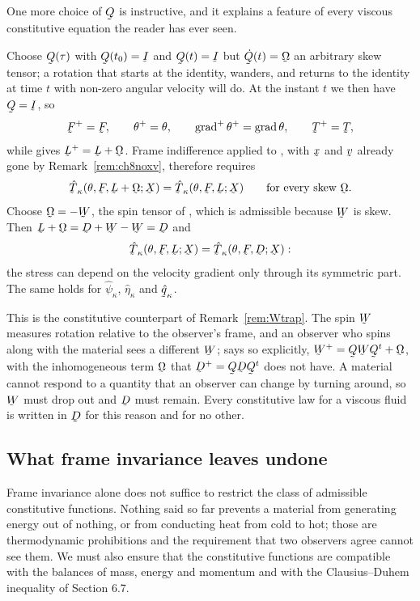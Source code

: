 \begin{remark}
\label{rem:ch8Donly}
One more choice of $\bQ$ is instructive, and it explains a feature of
every viscous constitutive equation the reader has ever seen.

Choose $\bQ(\tau)$ with $\bQ(t_{0})=\I$ and $\bQ(t)=\I$ but
$\dot\bQ(t)=\bOm$ an arbitrary skew tensor; a rotation that starts at
the identity, wanders, and returns to the identity at time $t$ with
non-zero angular velocity will do. At the instant $t$ we then have
$\bQ=\I$, so
\[
   \bF^{+}=\bF,\qquad
   \theta^{+}=\theta,\qquad
   \grad^{+}\theta^{+}=\grad\theta,\qquad
   \bT^{+}=\bT,
\]
while  gives $\bL^{+}=\bL+\bOm$. Frame indifference applied to
, with $\bx$ and $\bv$ already gone by
Remark~\ref{rem:ch8noxv}, therefore requires
\[
   \hat\bT_{\kappa}(\theta,\bF,\bL+\bOm;\bX)
   =\hat\bT_{\kappa}(\theta,\bF,\bL;\bX)
   \qquad\text{for every skew }\bOm .
\]
Choose $\bOm=-\bW$, the spin tensor of , which is admissible
because $\bW$ is skew. Then $\bL+\bOm=\bD+\bW-\bW=\bD$ and
\[
   \hat\bT_{\kappa}(\theta,\bF,\bL;\bX)
   =\hat\bT_{\kappa}(\theta,\bF,\bD;\bX):
\]
the stress can depend on the velocity gradient only through its
symmetric part. The same holds for $\hat\psi_{\kappa}$,
$\hat\eta_{\kappa}$ and $\hat\bq_{\kappa}$.

This is the constitutive counterpart of Remark~\ref{rem:Wtrap}. The spin
$\bW$ measures rotation relative to the observer's frame, and an
observer who spins along with the material sees a different $\bW$;
 says so explicitly, $\bW^{+}=\bQ\bW\bQ^{t}+\bOm$, with the
inhomogeneous term $\bOm$ that $\bD^{+}=\bQ\bD\bQ^{t}$ does not have.
A material cannot respond to a quantity that an observer can change by
turning around, so $\bW$ must drop out and $\bD$ must remain. Every
constitutive law for a viscous fluid is written in $\bD$ for this
reason and for no other.
\end{remark}

\subsection*{What frame invariance leaves undone}

Frame invariance alone does not suffice to restrict the class of
admissible constitutive functions. Nothing said so far prevents a
material from generating energy out of nothing, or from conducting heat
from cold to hot; those are thermodynamic prohibitions and the
requirement that two observers agree cannot see them. We must also
ensure that the constitutive functions are compatible with the balances
of mass, energy and momentum and with the Clausius--Duhem inequality of
Section 6.7.

